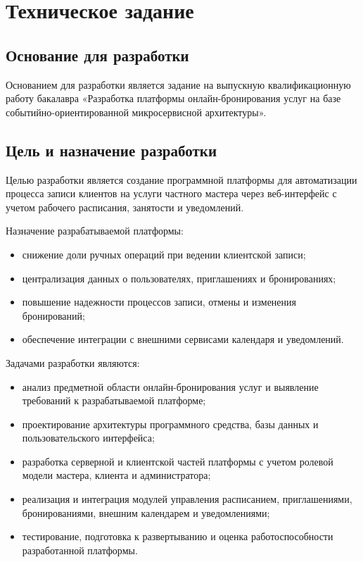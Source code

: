 \section{Техническое задание}
\subsection{Основание для разработки}

Основанием для разработки является задание на выпускную квалификационную работу бакалавра «Разработка платформы онлайн-бронирования услуг на базе событийно-ориентированной микросервисной архитектуры».

\subsection{Цель и назначение разработки}

Целью разработки является создание программной платформы для автоматизации процесса записи клиентов на услуги частного мастера через веб-интерфейс с учетом рабочего расписания, занятости и уведомлений.

Назначение разрабатываемой платформы:
\begin{itemize}
\item снижение доли ручных операций при ведении клиентской записи;
\item централизация данных о пользователях, приглашениях и бронированиях;
\item повышение надежности процессов записи, отмены и изменения бронирований;
\item обеспечение интеграции с внешними сервисами календаря и уведомлений.
\end{itemize}

Задачами разработки являются:
\begin{itemize}
\item анализ предметной области онлайн-бронирования услуг и выявление требований к разрабатываемой платформе;
\item проектирование архитектуры программного средства, базы данных и пользовательского интерфейса;
\item разработка серверной и клиентской частей платформы с учетом ролевой модели мастера, клиента и администратора;
\item реализация и интеграция модулей управления расписанием, приглашениями, бронированиями, внешним календарем и уведомлениями;
\item тестирование, подготовка к развертыванию и оценка работоспособности разработанной платформы.
\end{itemize}

